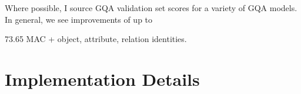 
Where possible, I source GQA validation set scores for a variety of GQA models. In general, we see improvements of up to 



73.65 MAC + object, attribute, relation identities.



\section{Implementation Details}

